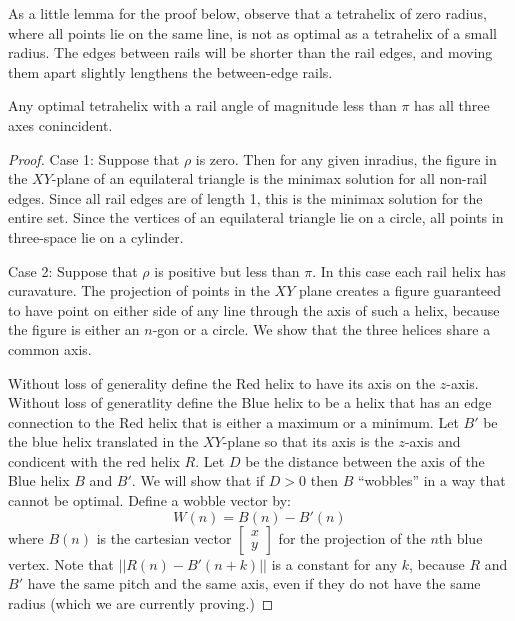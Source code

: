 \documentclass[review]{siamonline1116}
\begin{document}
As a little lemma for the proof below, observe that a tetrahelix of zero radius, where
all points lie on the same line,
is not as optimal as a tetrahelix of a small radius. The edges between rails will be
shorter than the rail edges, and moving them apart slightly lengthens the between-edge
rails.

\begin{theorem}
  Any optimal tetrahelix with a rail angle of magnitude less than $\pi$ has all three
  axes conincident.
  \label{thm:conincident}
\end{theorem}
\begin{proof}
  Case 1: Suppose that $\rho$ is zero. Then for any given inradius, the
  figure in the $XY$-plane of an equilateral
  triangle is the minimax solution for all non-rail edges. Since all
  rail edges are of length 1, this is the minimax solution for the entire set. Since
  the vertices of an equilateral triangle lie on a circle, all points in three-space lie on
  a cylinder.

  Case 2: Suppose that $\rho$ is positive but less than $\pi$.
  In this case each rail helix has
  curavature. The projection of points in the $XY$ plane creates a figure
  guaranteed to have point on either side of any line through the axis of such
  a helix, because the figure is either an $n$-gon or a circle.
  We show that the three helices share a common axis.

  Without loss of generality define the Red helix to have its axis on the $z$-axis.
  Without loss of generatlity define the Blue helix to be a helix that
  has an edge connection to the Red helix that is either a maximum or a minimum.
  Let $B'$ be the blue helix translated in the $XY$-plane so that its axis is the $z$-axis and
  condicent with the red helix $R$. Let $D$ be the distance between the axis of the Blue helix
  $B$ and $B'$. We will show that if $D>0$ then $B$ ``wobbles'' in a way that cannot be optimal.
  Define a wobble vector by:
  \begin{equation*}
    W(n) = B(n) - B'(n)
  \end{equation*}
  where $B(n)$ is the cartesian vector
  $\begin{bmatrix}
    x \\
    y 
  \end{bmatrix}$
  for the projection of the $n$th blue vertex.
  Note that $|| R(n) - B'(n+k)||$ is a constant for any $k$, because $R$ and $B'$ have the
  same pitch and the same axis, even if they do not have the same radius
  (which we are currently proving.)


\end{proof}
\end{document}
